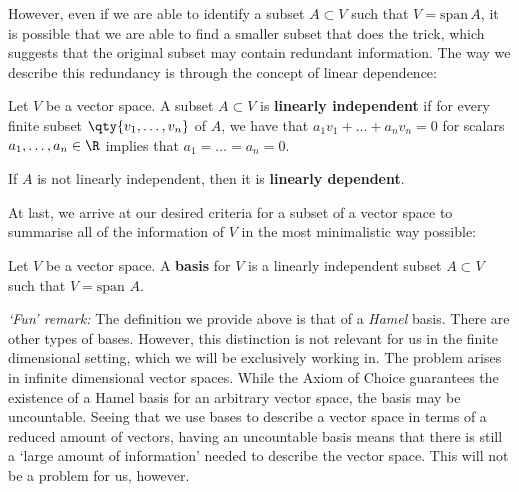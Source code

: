 \vspace{3mm}

However, even if we are able to identify a subset \( A\subset V \) such that \( V=\text{span}\,A \), it is possible that we are able to find a smaller subset that does the trick, which suggests that the original subset may contain redundant information. The way we describe this redundancy is through the concept of linear dependence:

\begin{definition}
  Let \( V \) be a vector space. A subset \( A\subset V \) is \textbf{linearly independent} if for every finite subset \( \qty{v_1,\dots, v_n} \) of \( A \), we have that \(a_1v_1+\dots +a_nv_n=0  \) for scalars \( a_1,\dots, a_n\in\R \) implies that \( a_1=\dots =a_n=0 \).

  \vspace{3mm}

  If \( A \) is not linearly independent, then it is \textbf{linearly dependent}.
\end{definition}

At last, we arrive at our desired criteria for a subset of a vector space to summarise all of the information of \( V \) in the most minimalistic way possible:

\begin{definition}
  Let \( V \) be a vector space. A \textbf{basis} for \( V \) is a linearly independent subset \( A\subset V \) such that \( V=\text{span }A \).
\end{definition}

\emph{`Fun' remark:} The definition we provide above is that of a \emph{Hamel} basis. There are other types of bases. However, this distinction is not relevant for us in the finite dimensional setting, which we will be exclusively working in. The problem arises in infinite dimensional vector spaces. While the Axiom of Choice guarantees the existence of a Hamel basis for an arbitrary vector space, the basis may be uncountable. Seeing that we use bases to describe a vector space in terms of a reduced amount of vectors, having an uncountable basis means that there is still a `large amount of information' needed to describe the vector space. This will not be a problem for us, however.

\vspace{3mm}

